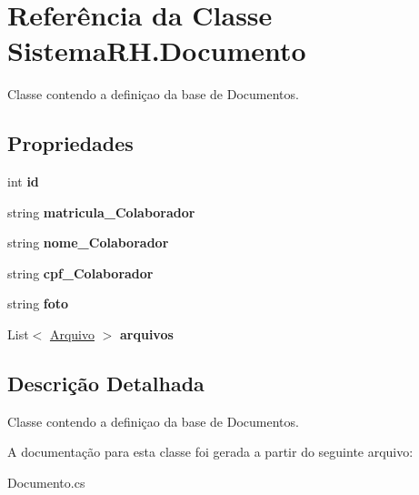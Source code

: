 \hypertarget{class_sistema_r_h_1_1_documento}{
\section{Referência da Classe SistemaRH.Documento}
\label{class_sistema_r_h_1_1_documento}
}


Classe contendo a definiçao da base de Documentos.  


\subsection*{Propriedades}
\begin{DoxyCompactItemize}
\item 
\hypertarget{class_sistema_r_h_1_1_documento_ab6cf98ce645fd5e089c4901cb5f18723}{
int {\bfseries id}}
\label{class_sistema_r_h_1_1_documento_ab6cf98ce645fd5e089c4901cb5f18723}

\item 
\hypertarget{class_sistema_r_h_1_1_documento_ae4fe1169de9fe7c8dd89ee957f59d5c3}{
string {\bfseries matricula\_\-Colaborador}}
\label{class_sistema_r_h_1_1_documento_ae4fe1169de9fe7c8dd89ee957f59d5c3}

\item 
\hypertarget{class_sistema_r_h_1_1_documento_a73d706a31b121dcb966461c1d73491ad}{
string {\bfseries nome\_\-Colaborador}}
\label{class_sistema_r_h_1_1_documento_a73d706a31b121dcb966461c1d73491ad}

\item 
\hypertarget{class_sistema_r_h_1_1_documento_aebd516baf98172e7e4ac21f54c9b676e}{
string {\bfseries cpf\_\-Colaborador}}
\label{class_sistema_r_h_1_1_documento_aebd516baf98172e7e4ac21f54c9b676e}

\item 
\hypertarget{class_sistema_r_h_1_1_documento_a486a79e06a7cc8ccd1c8b115d353f737}{
string {\bfseries foto}}
\label{class_sistema_r_h_1_1_documento_a486a79e06a7cc8ccd1c8b115d353f737}

\item 
\hypertarget{class_sistema_r_h_1_1_documento_aae4aa23255776f793cc58b3c38c66e8f}{
List$<$ \hyperlink{class_sistema_r_h_1_1_arquivo}{Arquivo} $>$ {\bfseries arquivos}}
\label{class_sistema_r_h_1_1_documento_aae4aa23255776f793cc58b3c38c66e8f}

\end{DoxyCompactItemize}


\subsection{Descrição Detalhada}
Classe contendo a definiçao da base de Documentos. 

A documentação para esta classe foi gerada a partir do seguinte arquivo:\begin{DoxyCompactItemize}
\item 
Documento.cs\end{DoxyCompactItemize}
